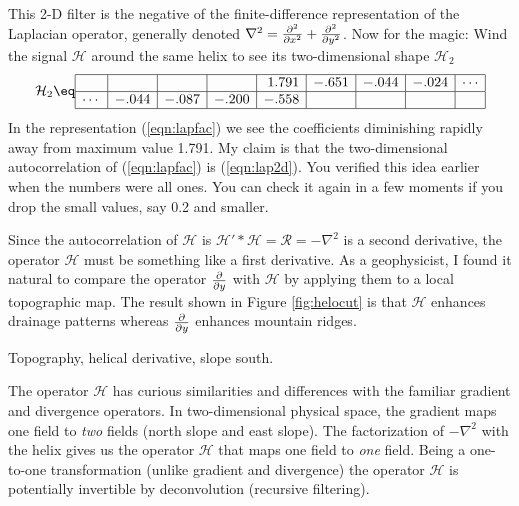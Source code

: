 This 2-D filter is the negative of the finite-difference representation
of the Laplacian operator, generally denoted
$\nabla^2= {\partial^2\over \partial x^2} + {\partial^2\over \partial y^2} $.
Now for the magic:
Wind the signal $\mathcal{H}$ around the same helix
to see its two-dimensional shape $\mathcal{H}_2$
\begin{equation}
\label{eqn:lapfac}
 {\mathcal{H}_2}
\eq
    \begin{array} {|r|r|r|r|r|r|r|r|r|} \hline
             &      &       &       & 1.791 &  -.651 & -.044  & -.024& \cdots \\
	     \hline 
      \cdots &-.044 & -.087 & -.200 & -.558 &        &        &      &
     \\ \hline
    \end{array}
\end{equation}
In the representation (\ref{eqn:lapfac}) we see the coefficients diminishing
rapidly away from maximum value 1.791.
My claim is that the two-dimensional autocorrelation of (\ref{eqn:lapfac})
is (\ref{eqn:lap2d}).
You verified this idea earlier when the numbers were all ones.
You can check it again in a few moments
if you drop the small values, say 0.2 and smaller.


\par
Since the autocorrelation of $\mathcal{H}$ is
$\mathcal{H}' \ast \mathcal{H} = \mathcal{R} =-\nabla^2$
is a second derivative,
the operator $\mathcal{H}$ must be something like a first derivative.
As a geophysicist, I found it natural to compare
the operator ${\partial\over\partial y}$
with $\mathcal{H}$ by applying them to a local topographic map.
The result shown in
Figure \ref{fig:helocut}
is that $\mathcal{H}$ enhances drainage patterns whereas
${\partial\over\partial y}$ enhances mountain ridges.


 {
  Topography, helical derivative, slope south.
}

\par
The operator $\mathcal{H}$ has
curious similarities and differences
with the familiar gradient and divergence operators.
In two-dimensional physical space,
the gradient maps one field to {\em two} fields
(north slope and east slope).
The factorization of $-\nabla^2$ with the helix
gives us the operator $\mathcal{H}$
that maps one field to {\em  one} field.
Being a one-to-one transformation
(unlike gradient and divergence)
the operator $\mathcal{H}$ is potentially invertible
by deconvolution (recursive filtering).

